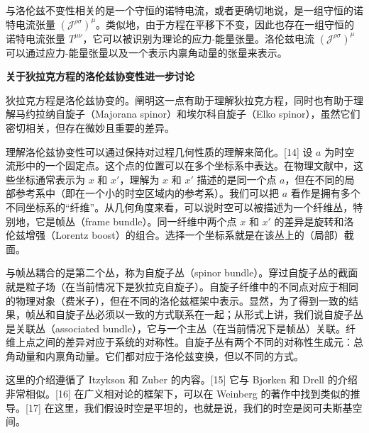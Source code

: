 与洛伦兹不变性相关的是一个守恒的诺特电流，或者更确切地说，是一组守恒的诺特电流张量 \( ({\mathcal {J}}^{\rho \sigma})^{\mu} \)。类似地，由于方程在平移下不变，因此也存在一组守恒的诺特电流张量 \( T^{\mu \nu} \)，它可以被识别为理论的应力-能量张量。洛伦兹电流 \( ({\mathcal {J}}^{\rho \sigma})^{\mu} \) 可以通过应力-能量张量以及一个表示内禀角动量的张量来表示。

\textbf{关于狄拉克方程的洛伦兹协变性进一步讨论}

狄拉克方程是洛伦兹协变的。阐明这一点有助于理解狄拉克方程，同时也有助于理解马约拉纳自旋子（Majorana spinor）和埃尔科自旋子（Elko spinor），虽然它们密切相关，但存在微妙且重要的差异。

理解洛伦兹协变性可以通过保持对过程几何性质的理解来简化。[14] 设 \( a \) 为时空流形中的一个固定点。这个点的位置可以在多个坐标系中表达。在物理文献中，这些坐标通常表示为 \( x \) 和 \( x' \)，理解为 \( x \) 和 \( x' \) 描述的是同一个点 \( a \)，但在不同的局部参考系中（即在一个小的时空区域内的参考系）。我们可以把 \( a \) 看作是拥有多个不同坐标系的“纤维”。从几何角度来看，可以说时空可以被描述为一个纤维丛，特别地，它是帧丛（frame bundle）。同一纤维中两个点 \( x \) 和 \( x' \) 的差异是旋转和洛伦兹增强（Lorentz boost）的组合。选择一个坐标系就是在该丛上的（局部）截面。

与帧丛耦合的是第二个丛，称为自旋子丛（spinor bundle）。穿过自旋子丛的截面就是粒子场（在当前情况下是狄拉克自旋子）。自旋子纤维中的不同点对应于相同的物理对象（费米子），但在不同的洛伦兹框架中表示。显然，为了得到一致的结果，帧丛和自旋子丛必须以一致的方式联系在一起；从形式上讲，我们说自旋子丛是关联丛（associated bundle），它与一个主丛（在当前情况下是帧丛）关联。纤维上点之间的差异对应于系统的对称性。自旋子丛有两个不同的对称性生成元：总角动量和内禀角动量。它们都对应于洛伦兹变换，但以不同的方式。

这里的介绍遵循了 Itzykson 和 Zuber 的内容。[15] 它与 Bjorken 和 Drell 的介绍非常相似。[16] 在广义相对论的框架下，可以在 Weinberg 的著作中找到类似的推导。[17] 在这里，我们假设时空是平坦的，也就是说，我们的时空是闵可夫斯基空间。

